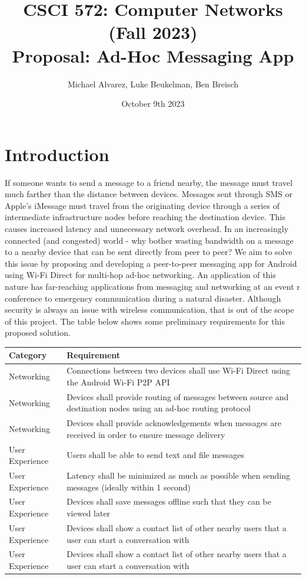 \documentclass[10pt]{article}
\title{{\normalsize CSCI 572: Computer Networks (Fall 2023)}\\Proposal: Ad-Hoc Messaging App}
\author{Michael Alvarez, Luke Beukelman, Ben Breisch}
\date{October 9th 2023}
\begin{document}
\maketitle

\section{Introduction}
If someone wants to send a message to a friend nearby, the message must travel much farther than the distance between devices. Messages sent through SMS or Apple's iMessage must travel from the originating device through a series of intermediate infrastructure nodes before reaching the destination device. This causes increased latency and unnecessary network overhead. In an increasingly connected (and congested) world - why bother wasting bandwidth on a message to a nearby device that can be sent directly from peer to peer? We aim to solve this issue by proposing and developing a peer-to-peer messaging app for Android using Wi-Fi Direct for multi-hop ad-hoc networking. An application of this nature has far-reaching applications from messaging and networking at an event r conference to emergency communication during a natural disaster. Although security is always an issue with wireless communication, that is out of the scope of this project. The table below shows some preliminary requirements for this proposed solution.
\begin{center}
\begin{tabular}{| p{} | p{} |} 
 \hline
 Category & Requirement \\ \hline
 Networking & Connections between two devices shall use Wi-Fi Direct using the Android Wi-Fi P2P API  \\ \hline
 Networking & Devices shall provide routing of messages between source and destination nodes using an ad-hoc routing protocol  \\ \hline
  Networking & Devices shall provide acknowledgements when messages are received in order to ensure message delivery  \\ \hline
 User Experience  & Users shall be able to send text and file messages \\ \hline
 User Experience  & Latency shall be minimized as much as possible when sending messages (ideally within 1 second) \\ \hline
 User Experience  & Devices shall save messages offline such that they can be viewed later \\ \hline
 User Experience  & Devices shall show a contact list of other nearby users that a user can start a conversation with \\ \hline
 User Experience  & Devices shall show a contact list of other nearby users that a user can start a conversation with \\ \hline
\end{tabular}
\end{center}
\end{document}
